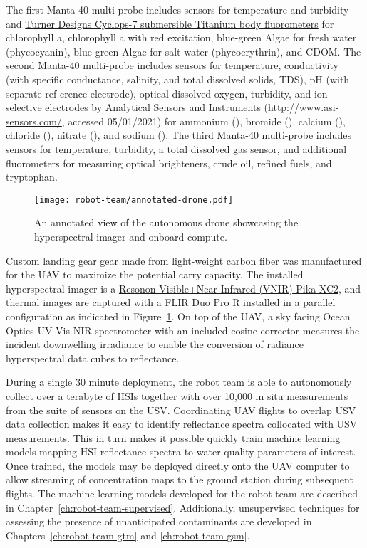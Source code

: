 The first Manta-40 multi-probe includes sensors for temperature and turbidity
and
\href{https://www.turnerdesigns.com/cyclops-7f-submersible-fluorometer}{Turner
  Designs Cyclops-7 submersible Titanium body fluorometers} for chlorophyll a,
chlorophyll a with red excitation, blue-green Algae for fresh water
(phycocyanin), blue-green Algae for salt water (phycoerythrin), and CDOM.
The second Manta-40 multi-probe includes sensors for temperature, conductivity
(with specific conductance, salinity, and total dissolved solids, TDS), pH (with
separate ref-erence electrode), optical dissolved-oxygen, turbidity, and ion
selective electrodes by Analytical Sensors and Instruments
(\url{http://www.asi-sensors.com/}, accessed 05/01/2021) for ammonium
(), bromide (), calcium (), chloride (),
nitrate (), and sodium (). The third Manta-40 multi-probe
includes sensors for temperature, turbidity, a total dissolved gas sensor, and
additional fluorometers for measuring optical brighteners, crude oil, refined
fuels, and tryptophan.

\begin{figure}[!hbt]
  \centering
  \texttt{[image: robot-team/annotated-drone.pdf]}
  \caption{An annotated view of the autonomous drone showcasing the hyperspectral imager and onboard compute.}
  \label{fig:uav-closeup}
\end{figure}

Custom landing gear gear made from light-weight
carbon fiber was manufactured for the UAV to maximize the potential carry
capacity. The installed hyperspectral imager is a
\href{https://resonon.com/Pika-XC2}{Resonon Visible+Near-Infrared (VNIR) Pika
  XC2}, and thermal images are captured with
a \href{https://www.flir.com/products/duo-pro-r/}{FLIR Duo Pro R} installed
in a parallel configuration as indicated in Figure~\ref{fig:uav-closeup}. On top
of the UAV, a sky facing Ocean Optics UV-Vis-NIR spectrometer with an included
cosine corrector measures the incident downwelling irradiance to enable the
conversion of radiance hyperspectral data cubes to reflectance.

During a single 30 minute deployment, the robot team is able to autonomously
collect over a terabyte of HSIs together with over 10,000 in situ measurements
from the suite of sensors on the USV. Coordinating UAV flights to overlap USV
data collection makes it easy to identify reflectance spectra collocated with
USV measurements. This in turn makes it possible quickly train machine learning
models mapping HSI reflectance spectra to water quality parameters of interest.
Once trained, the models may be deployed directly onto the UAV computer to allow
streaming of concentration maps to the ground station during subsequent flights.
The machine learning models developed for the robot team are described in
Chapter~\ref{ch:robot-team-supervised}. Additionally, unsupervised techniques
for assessing the presence of unanticipated contaminants are developed in
Chapters~\ref{ch:robot-team-gtm} and
\ref{ch:robot-team-gsm}.

